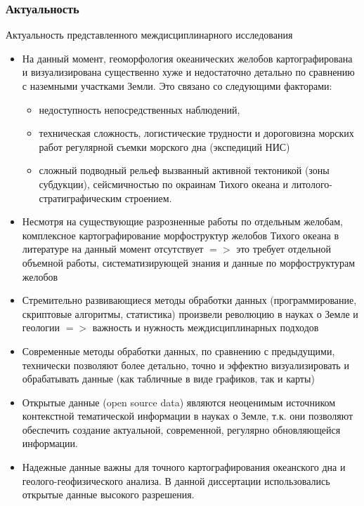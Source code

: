 \documentclass[pdflatex,compress,8pt,
	xcolor={dvipsnames,dvipsnames,svgnames,x11names,table},
	hyperref={colorlinks = true,breaklinks = true, urlcolor = NavyBlue}]{beamer}
\begin{document}
\begin{frame}\frametitle{Актуальность}
\vspace{1em}
\begin{exampleblock}{Актуальность представленного междисциплинарного исследования}
\begin{itemize}\small
	 \item На данный момент, геоморфология океанических желобов картографирована и визуализирована существенно хуже и недостаточно детально по сравнению с наземными участками Земли. Это связано со следующими факторами: 
	 	\begin{itemize}
			 \item недоступность непосредственных наблюдений, 
			 \item техническая сложность, логистические трудности и дороговизна морских работ регулярной съемки морского дна (экспедиций НИС)
			 \item сложный подводный рельеф вызванный активной тектоникой (зоны субдукции), сейсмичностью по окраинам Тихого океана и литолого-стратиграфическим строением. 
		\end{itemize}
	\item Несмотря на существующие разрозненные работы по отдельным желобам, комплексное картографирование морфоструктур желобов Тихого океана в литературе на данный момент отсутствует $=>$ это требует отдельной объемной работы, систематизирующей знания и данные по морфоструктурам желобов
	\item Стремительно развивающиеся методы обработки данных (программирование, скриптовые алгоритмы, статистика) произвели революцию в науках о Земле и геологии $=>$ важность и нужность междисциплинарных подходов
	\item Современные методы обработки данных, по сравнению с предыдущими, технически позволяют более детально, точно и эффектно визуализировать и обрабатывать данные (как табличные в виде графиков, так и карты)
	\item Открытые данные (open source data) являются неоценимым источником контекстной тематической информации в науках о Земле, т.к. они позволяют обеспечить создание актуальной, современной, регулярно обновляющейся информации. 
	\item Надежные данные важны для точного картографирования океанского дна и геолого-геофизического анализа. В данной диссертации использовались открытые данные высокого разрешения. 

\end{itemize}
\end{exampleblock}
\end{frame}
\end{document}
